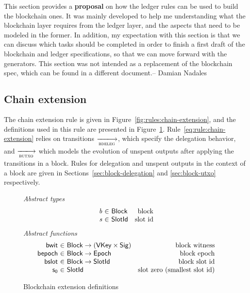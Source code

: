 \begin{note}
  This section provides a \textbf{proposal} on how the ledger rules can be used
  to build the blockchain ones. It was mainly developed to help me
  understanding what the blockchain layer requires from the ledger layer, and
  the aspects that need to be modeled in the former. In addition, my
  expectation with this section is that we can discuss which tasks should be
  completed in order to finish a first draft of the blockchain and ledger
  specifications, so that we can move forward with the generators. This section
  was not intended as a replacement of the blockchain spec, which can be found
  in a different document.-- Damian Nadales
\end{note}

\subsection{Chain extension}
\label{sec:chain-extension}

The chain extension rule is given in Figure~\ref{fig:rules:chain-extension},
and the definitions used in this rule are presented in
Figure~\ref{fig:defs:chain-extension}. Rule~\ref{eq:rule:chain-extension}
relies on transitions $\trans{bdeleg}{}$, which specify the delegation
behavior, and $\trans{butxo}{}$ which models the evolution of unspent outputs
after applying the transitions in a block. Rules for delegation and unspent
outputs in the context of a block are given in
Sections~\ref{sec:block-delegation} and \ref{sec:block-utxo} respectively.

\begin{figure}
  \emph{Abstract types}
  \begin{equation*}
    \begin{array}{r@{~\in~}lr}
      \var{b} & \Block & \text{block}\\
      \var{s} & \SlotId & \text{slot id}\\
    \end{array}
  \end{equation*}
  \emph{Abstract functions}
  \begin{equation*}
    \begin{array}{r@{~\in~}lr}
    \fun{bwit} & \Block \to (\VKey \times \Sig) & \text{block witness}\\
      \fun{bepoch} & \Block \to \Epoch & \text{block epoch}\\
      \fun{bslot} & \Block \to \SlotId & \text{block slot id}\\
    \fun{s_0} & \SlotId  & \text{slot zero (smallest slot id)}\\
    \end{array}
  \end{equation*}
  \caption{Blockchain extension definitions}
  \label{fig:defs:chain-extension}
\end{figure}

